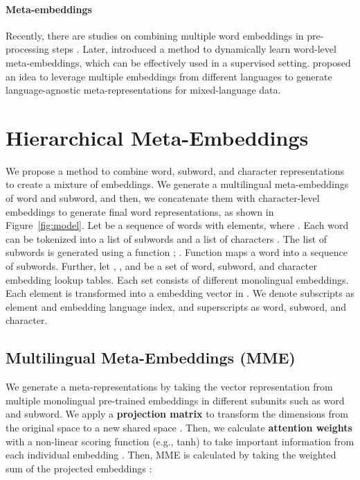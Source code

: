 \documentclass[11pt,a4paper]{article}
\begin{document}
\paragraph{Meta-embeddings}
Recently, there are studies on combining multiple word embeddings in pre-processing steps  \cite{yin2016learning,muromagi2017linear,bollegala2018think,coates2018frustratingly}. Later, \citet{kiela2018dynamic} introduced a method to dynamically learn word-level meta-embeddings, which can be effectively used in a supervised setting. \citet{winata2019learning} proposed an idea to leverage multiple embeddings from different languages to generate language-agnostic meta-representations for mixed-language data. 


\section{Hierarchical Meta-Embeddings}
We propose a method to combine word, subword, and character representations to create a mixture of embeddings. We generate a multilingual meta-embeddings of word and subword, and then, we concatenate them with character-level embeddings to generate final word representations, as shown in Figure~\ref{fig:model}. Let  be a sequence of words with  elements, where . Each word can be tokenized into a list of subwords  and a list of characters . The list of subwords  is generated using a function ; . Function  maps a word into a sequence of subwords. Further, let , , and  be a set of word, subword, and character embedding lookup tables. Each set consists of different monolingual embeddings. Each element is transformed into a embedding vector in . We denote subscripts  as element and embedding language index, and superscripts  as word, subword, and character.

\subsection{Multilingual Meta-Embeddings (MME)}
We generate a meta-representations by taking the vector representation from multiple monolingual pre-trained embeddings in different subunits such as word and subword. We apply a \textbf{projection matrix}  to transform the dimensions from the original space  to a new shared space . Then, we calculate \textbf{attention weights}  with a non-linear scoring function  (e.g., tanh) to take important information from each individual embedding . Then, MME is calculated by taking the weighted sum of the projected embeddings :
\end{document}
